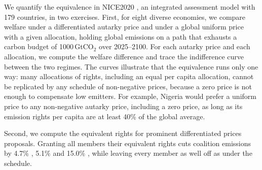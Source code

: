 \documentclass[12pt,english]{article}
\theoremstyle{remark}
\begin{document}
We quantify the equivalence in NICE2020 \citep{young-brun_within-country_2025}, an integrated assessment model with 179 countries, %
in two exercises. First, for eight diverse economies, we compare welfare under a differentiated autarky price and under a global uniform price with a given allocation, holding global emissions on a path that exhausts a carbon budget of 1000\,GtCO$_2$ over 2025--2100. For each autarky price and each allocation, we compute the welfare difference and trace the indifference curve between the two regimes. %
The curves illustrate that the equivalence runs only one way: many allocations of rights, including an equal per capita allocation, cannot be replicated by any schedule of non-negative prices, because a zero price is not enough to compensate low emitters.
For example, Nigeria would prefer a uniform price to any non-negative autarky price, including a zero price, as long as its emission rights per capita are at least 40\% of the global average. %

Second, we compute the equivalent rights for prominent differentiated prices proposals. %
Granting all members their equivalent rights cuts coalition emissions by 4.7\% \citep{banerjee_grand_2025}, 5.1\% \citep{wolfram_building_2025}
and 15.0\% \citep{equal_right_climate_2023}, while leaving every member as well off as under the schedule. 
\end{document}
